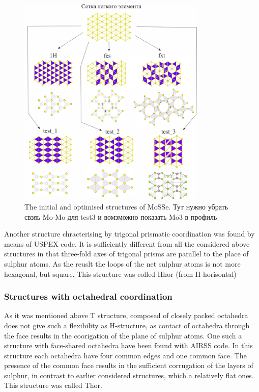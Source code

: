 \documentclass[a4paperm]{article}
\begin{document}
\begin{figure}[H] \centering
        \includegraphics[width=0.8\textwidth]{H-based.jpg}
        \caption{The initial and optimised structures of MoSSe. Тут нужно убрать свзяь Mo-Mo для test3 и вомзможно показать Mo3 в профиль}
\label{H-based}
\end{figure}


Another structure chracterising by trigonal prismatic coordination was found by means of USPEX code.
It is sufficiently different from all the considered above structures in that three-fold axes of trigonal prisms are parallel to the place of sulphur atoms.
As the reuslt the loops of the net sulphur atoms is not more hexagonal, but square. 
This structure was colled Hhor (from H-horisontal)

\subsubsection{Structures with octahedral coordination}

As it was mentioned above T structure, composed of closely packed octahedra does not give such a flexibility as H-structure, as contact of octahedra through the face results in the coorigation of the plane of sulphur atoms. 
One such a structure with face-shared octahedra have been found with AIRSS code.
In this structure each octahedra have four common edges and one common face.
The presence of the common face results in the sufficient corrugation of the layers of sulphur, in contrast to earlier considered structures, which a relatively flat ones.
This structure was called Thor.
\end{document}

